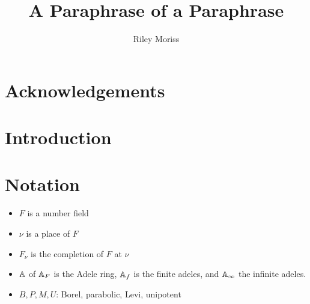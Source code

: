 \documentclass[10pt, openany]{book}
\title{A Paraphrase of a Paraphrase}
\author{Riley Moriss}
\numberwithin{equation}{section}
\theoremstyle{definition}
\theoremstyle{remark}
\numberwithin{equation}{section}
\begin{document}
\begin{comment}%
    \begin{titlepage}
    \begin{center}
    \vspace*{1cm}
    \huge
    \textbf{A Paraphrase of a Paraphrase}\\
    \vspace{2cm}
    \Large
    \text{Riley Moriss}\\
    \vspace{0.5cm}
    \text{Supervisor: Dr. Chenyan Wu }\\    
 
    A thesis submitted in partial fulfillment of the\\
    requirements for the degree of\\
    Master of Science\\
    in the\\
    School of Mathematics and Statistics\\
    at\\
    The University of Melbourne\\
    \vspace{1,5cm}
    October 2024
\end{center}
\end{titlepage}

\pagebreak
\end{comment}


\chapter*{Acknowledgements}

\chapter*{Introduction}


\tableofcontents
{}

\chapter*{Notation}

\begin{itemize}
    \item \(F\) is a number field
    \item \(\nu\) is a place of \(F\)
    \item \(F_\nu\) is the completion of \(F\) at \(\nu\)
    \item \(\A\) of \(\A_F\) is the Adele ring, \(\A_f\) is the finite adeles, and \(\A_\infty\) the infinite adeles.
    \item \(B, P, M, U\): Borel, parabolic, Levi, unipotent
\end{itemize}
\end{document}
